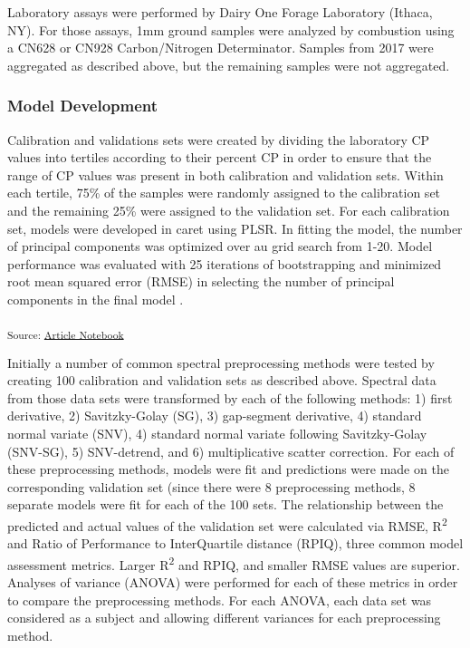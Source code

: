 \documentclass[
]{agujournal2019}
\begin{document}
Laboratory assays were performed by Dairy One Forage Laboratory (Ithaca,
NY). For those assays, 1mm ground samples were analyzed by combustion
using a CN628 or CN928 Carbon/Nitrogen Determinator. Samples from 2017
were aggregated as described above, but the remaining samples were not
aggregated.

\subsubsection{Model Development}\label{model-development}

Calibration and validations sets were created by dividing the laboratory
CP values into tertiles according to their percent CP in order to ensure
that the range of CP values was present in both calibration and
validation sets. Within each tertile, 75\% of the samples were randomly
assigned to the calibration set and the remaining 25\% were assigned to
the validation set. For each calibration set, models were developed in
caret using PLSR. In fitting the model, the number of principal
components was optimized over au grid search from 1-20. Model
performance was evaluated with 25 iterations of bootstrapping and
minimized root mean squared error (RMSE) in selecting the number of
principal components in the final model .

\textsubscript{Source:
\href{https://rvcrawford.github.io/glowing-system/index.qmd.html}{Article
Notebook}}

Initially a number of common spectral preprocessing methods were tested
by creating 100 calibration and validation sets as described above.
Spectral data from those data sets were transformed by each of the
following methods: 1) first derivative, 2) Savitzky-Golay (SG), 3)
gap-segment derivative, 4) standard normal variate (SNV), 4) standard
normal variate following Savitzky-Golay (SNV-SG), 5) SNV-detrend, and 6)
multiplicative scatter correction. For each of these preprocessing
methods, models were fit and predictions were made on the corresponding
validation set (since there were 8 preprocessing methods, 8 separate
models were fit for each of the 100 sets. The relationship between the
predicted and actual values of the validation set were calculated via
RMSE, R\textsuperscript{2} and Ratio of Performance to InterQuartile
distance (RPIQ), three common model assessment metrics. Larger
R\textsuperscript{2} and RPIQ, and smaller RMSE values are superior.
Analyses of variance (ANOVA) were performed for each of these metrics in
order to compare the preprocessing methods. For each ANOVA, each data
set was considered as a subject and allowing different variances for
each preprocessing method.
\end{document}
